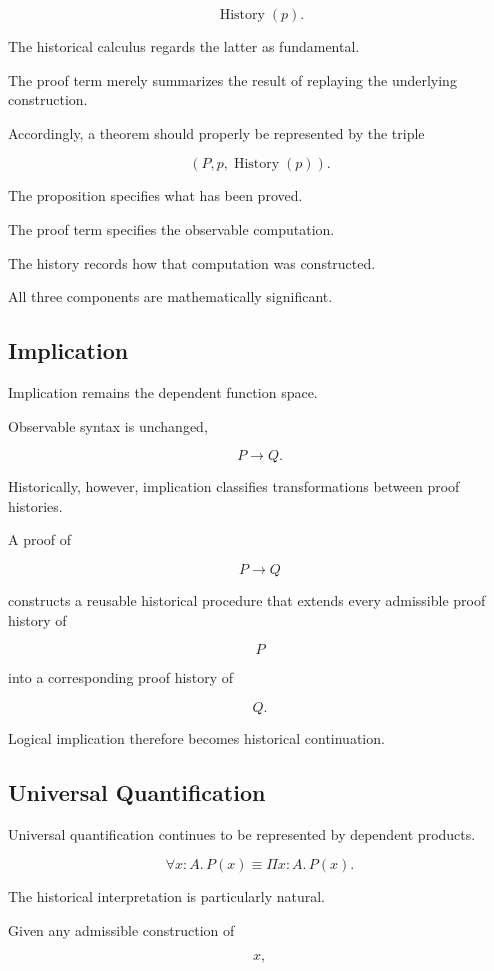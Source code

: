 \documentclass[12pt,oneside]{article}
\theoremstyle{definition}
\theoremstyle{remark}
\DeclareMathOperator{\History}{History}
\begin{document}
\[
\History(p).
\]

The historical calculus regards the latter as fundamental.

The proof term merely summarizes the result of replaying the underlying
construction.

Accordingly, a theorem should properly be represented by the triple

\[
(P,p,\History(p)).
\]

The proposition specifies what has been proved.

The proof term specifies the observable computation.

The history records how that computation was constructed.

All three components are mathematically significant.

\subsection{Implication}

Implication remains the dependent function space.

Observable syntax is unchanged,

\[
P
\rightarrow
Q.
\]

Historically, however, implication classifies transformations between proof
histories.

A proof of

\[
P
\rightarrow
Q
\]

constructs a reusable historical procedure that extends every admissible proof
history of

\[
P
\]

into a corresponding proof history of

\[
Q.
\]

Logical implication therefore becomes historical continuation.

\subsection{Universal Quantification}

Universal quantification continues to be represented by dependent products.

\[
\forall x:A.\,P(x)
\equiv
\Pi x:A.\,P(x).
\]

The historical interpretation is particularly natural.

Given any admissible construction of

\[
x,
\]
\end{document}

